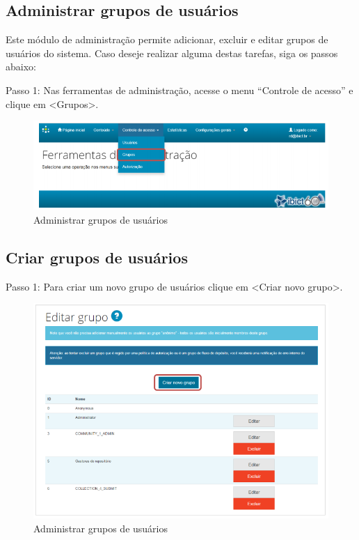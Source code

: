 \documentclass[12pt,hidelinks]{article}
\begin{document}
\newpage

    \subsection{Administrar grupos de usuários}
    
    Este módulo de administração permite adicionar, excluir e editar grupos de usuários do sistema. Caso deseje realizar alguma destas tarefas, siga os passos abaixo:
    
    \singlespacing
    
    Passo 1: Nas ferramentas de administração, acesse o menu “Controle de acesso” e clique em <Grupos>.
    
    \begin{figure}[!htp]
                \centering
                \includegraphics[scale=0.8]{figura/Figura63.png}
                \caption{Administrar grupos de usuários}
            \label{Rotulo}
        \end{figure}
    
    \subsection{Criar grupos de usuários}
    
    Passo 1: Para criar um novo grupo de usuários clique em <Criar novo grupo>.
    
    \begin{figure}[!htp]
                \centering
                \includegraphics[scale=0.8]{figura/Figura64.png}
                \caption{Administrar grupos de usuários}
            \label{Rotulo}
        \end{figure}
\newpage
    
\end{document}
